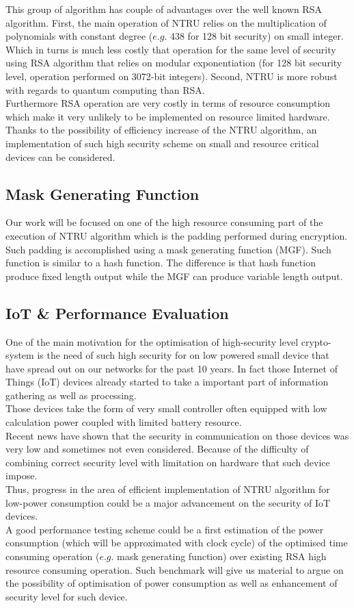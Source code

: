This group of algorithm has couple of advantages over the well known RSA algorithm. First, the main operation of NTRU relies on the multiplication of polynomials with constant degree ($e.g.$ 438 for 128 bit security) on small integer. Which in turns is much less costly that operation for the same level of security using RSA algorithm that relies on modular exponentiation (for 128 bit security level, operation performed on 3072-bit integers). Second, NTRU is more robust with regards to quantum computing than RSA.\\
Furthermore RSA operation are very costly in terms of resource consumption which make it very unlikely to be implemented on resource limited hardware. Thanks to the possibility of efficiency increase of the NTRU algorithm, an implementation of such high security scheme on small and resource critical devices can be considered.
\subsection{Mask Generating Function}
Our work will be focused on one of the high resource consuming part of the execution of NTRU algorithm which is the padding performed during encryption. Such padding is accomplished using a mask generating function (MGF). Such function is similar to a hash function. The difference is that hash function produce fixed length output while the MGF can produce variable length output.    \\

\subsection{IoT \& Performance Evaluation}
One of the main motivation for the optimisation of high-security level crypto-system is the need of such high security for on low powered small device that have spread out on our networks for the past 10 years. In fact those Internet of Things (IoT) devices already started to take a important part of information gathering as well as processing.\\
Those devices take the form of very small controller often equipped with low calculation power coupled with limited battery resource.\\
Recent news have shown that the security in communication on those devices was very low and sometimes not even considered. Because of the difficulty of combining correct security level with limitation on hardware that such device impose.\\
Thus, progress in the area of efficient implementation of NTRU algorithm for low-power consumption could be a major advancement on the security of IoT devices.
\\A good performance testing scheme could be a first estimation of the power consumption (which will be approximated with clock cycle) of the optimised time consuming operation ($e.g.$ mask generating function) over existing RSA high resource consuming operation. Such benchmark will give us material to argue on the possibility of optimisation of power consumption as well as  enhancement of security level for such device.

